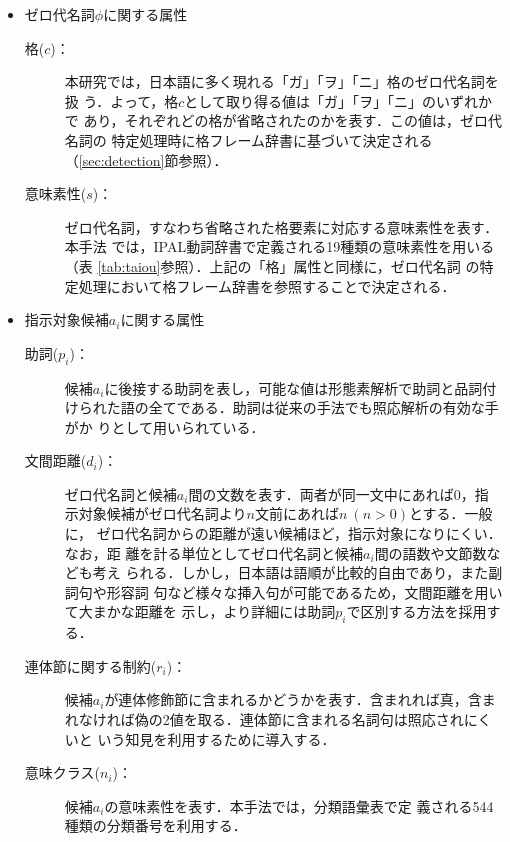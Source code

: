 \begin{itemize}

\item ゼロ代名詞$\phi$に関する属性
  \begin{description}
  \item[格($c$)：]

    本研究では，日本語に多く現れる「ガ」「ヲ」「ニ」格のゼロ代名詞を扱
    う．よって，格$c$として取り得る値は「ガ」「ヲ」「ニ」のいずれかで
    あり，それぞれどの格が省略されたのかを表す．この値は，ゼロ代名詞の
    特定処理時に格フレーム辞書に基づいて決定される
    （\mbox{\ref{sec:detection}節}参照）．
    
  \item[意味素性($s$)：] 

    ゼロ代名詞，すなわち省略された格要素に対応する意味素性を表す．本手法
    では，IPAL動詞辞書で定義される19種類の意味素性を用いる（表
    \ref{tab:taiou}参照）．上記の「格」属性と同様に，ゼロ代名詞
    の特定処理において格フレーム辞書を参照することで決定される．
  \end{description}

\item 指示対象候補$a_i$に関する属性
  \begin{description}
  \item[助詞($p_i$)：] 

    候補$a_i$に後接する助詞を表し，可能な値は形態素解析で助詞と品詞付
    けられた語の全てである．助詞は従来の手法でも照応解析の有効な手がか
    りとして用いられている．

  \item[文間距離($d_i$)：] 

    ゼロ代名詞と候補$a_i$間の文数を表す．両者が同一文中にあれば$0$，指
    示対象候補がゼロ代名詞より$n$文前にあれば$n~(n>0)$とする．一般に，
    ゼロ代名詞からの距離が遠い候補ほど，指示対象になりにくい．なお，距
    離を計る単位としてゼロ代名詞と候補$a_i$間の語数や文節数なども考え
    られる．しかし，日本語は語順が比較的自由であり，また副詞句や形容詞
    句など様々な挿入句が可能であるため，文間距離を用いて大まかな距離を
    示し，より詳細には助詞$p_i$で区別する方法を採用する．

  \item[連体節に関する制約($r_i$)：]

    候補$a_i$が連体修飾節に含まれるかどうかを表す．含まれれば真，含ま
    れなければ偽の2値を取る．連体節に含まれる名詞句は照応されにくいと
    いう知見\cite{ehar96}を利用するために導入する．

  \item[意味クラス($n_i$)：]

    候補$a_i$の意味素性を表す．本手法では，分類語彙表\cite{koku64}で定
    義される544種類の分類番号を利用する．

  \end{description}
\end{itemize}


